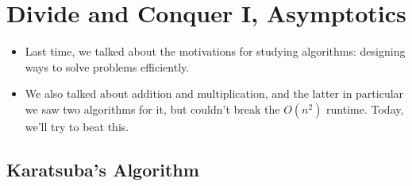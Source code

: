 \section{Divide and Conquer I, Asymptotics}
\begin{itemize}
	\item Last time, we talked about the motivations for studying algorithms: designing ways to solve problems efficiently. 
	\item We also talked about addition and multiplication, and the latter in particular we saw two algorithms for it, but 
		couldn't break the \( O(n^2) \) runtime. Today, we'll try to beat this.
\end{itemize}

\subsection{Karatsuba's Algorithm}
